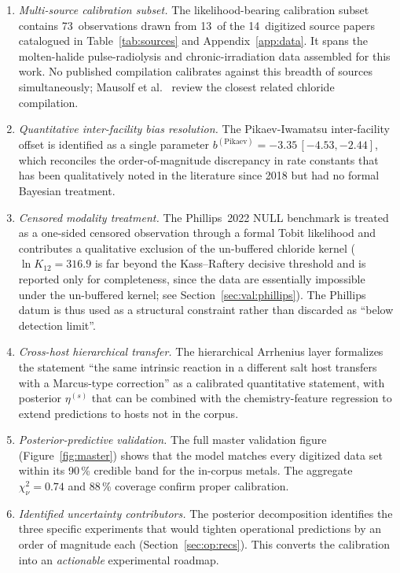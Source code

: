 \documentclass[11pt]{article}
\theoremstyle{plain}
\theoremstyle{definition}
\theoremstyle{remark}
\begin{document}
\begin{enumerate}
\item \emph{Multi-source calibration subset.}  The likelihood-bearing
      calibration subset contains 73~observations drawn from 13~of the
      14~digitized source papers catalogued in Table~\ref{tab:sources}
      and Appendix~\ref{app:data}.  It spans the molten-halide
      pulse-radiolysis and chronic-irradiation data assembled for this
      work.  No published compilation calibrates against this breadth of
      sources simultaneously; Mausolf et al.~\citep{Mausolf2024} review
      the closest related chloride compilation.
\item \emph{Quantitative inter-facility bias resolution.}  The
      Pikaev-Iwamatsu inter-facility offset is identified as a single
      parameter $b^{(\mathrm{Pikaev})} = -3.35\,[-4.53, -2.44]$, which
      reconciles the order-of-magnitude discrepancy in rate constants that
      has been qualitatively noted in the literature since 2018
      \citep{Horne2018,Iwamatsu2022} but had no formal Bayesian treatment.
\item \emph{Censored modality treatment.}  The Phillips~2022 NULL benchmark
      is treated as a one-sided censored observation through a formal Tobit
      likelihood and contributes a qualitative exclusion of the un-buffered
      chloride kernel ($\ln K_{12} = 316.9$ is far beyond the Kass--Raftery
      decisive threshold and is reported only for completeness, since the
      data are essentially impossible under the un-buffered kernel; see
      Section~\ref{sec:val:phillips}).  The Phillips datum is thus used as
      a structural constraint rather than discarded as ``below detection
      limit''.
\item \emph{Cross-host hierarchical transfer.}  The
      hierarchical Arrhenius layer formalizes the statement ``the same
      intrinsic reaction in a different salt host transfers with a
      Marcus-type correction'' as a calibrated quantitative statement,
      with posterior $\eta^{(s)}$ that can be combined with the
      chemistry-feature regression to extend predictions to hosts not in
      the corpus.
\item \emph{Posterior-predictive validation.}  The full master validation
      figure (Figure~\ref{fig:master}) shows that the model
      matches every digitized data set within its 90\,\% credible band for
      the in-corpus metals.  The aggregate $\chi^2_\nu = 0.74$ and 88\,\%
      coverage confirm proper calibration.
\item \emph{Identified uncertainty contributors.}  The posterior
      decomposition identifies the three specific experiments that would
      tighten operational predictions by an order of magnitude each
      (Section~\ref{sec:op:recs}).  This converts the calibration into an
      \emph{actionable} experimental roadmap.
\end{enumerate}
\end{document}
